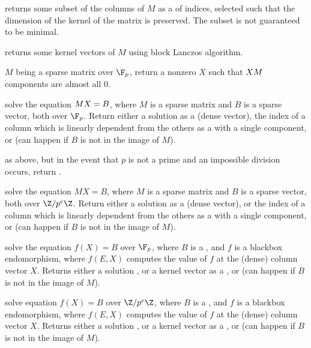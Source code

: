  returns some subset of the columns
of $M$ as a  of indices, selected such that the dimension of the
kernel of the matrix is preserved. The subset is not guaranteed to be minimal.

 returns some kernel vectors of $M$
using block Lanczos algorithm.

$M$ being a sparse matrix over $\F_p$, return a nonzero  $X$ such
that $X\*M$ components are almost all $0$.

solve the equation $M\*X = B$, where $M$ is a sparse matrix and $B$ is a sparse
vector, both over $\F_p$. Return either a solution as a  (dense
vector), the index of a column which is linearly dependent from the
others as a  with a single component, or 
(can happen if $B$ is not in the image of $M$).

as above, but in the event that $p$ is not a prime and an impossible division
occurs, return .

solve the equation $MX = B$, where $M$ is a sparse matrix and $B$ is a sparse
vector, both over $\Z/p^e\Z$. Return either a solution as a  (dense
vector), or the index of a column which is linearly dependent from the
others as a  with a single component, or 
(can happen if $B$ is not in the image of $M$).

solve the equation $f(X) = B$ over $\F_p$, where $B$ is a , and $f$
is a blackbox endomorphism, where $f(E, X)$ computes the value of $f$ at the
(dense) column vector $X$. Returns either a solution , or a kernel
vector as a , or 
(can happen if $B$ is not in the image of $M$).

solve equation $f(X) = B$ over $\Z/p^e\Z$, where $B$ is a , and $f$ is a
blackbox endomorphism, where $f(E, X)$ computes the value of $f$ at the
(dense) column vector $X$. Returns either a solution , or a kernel
vector as a , or  (can happen if $B$ is not in the image
of $M$).

